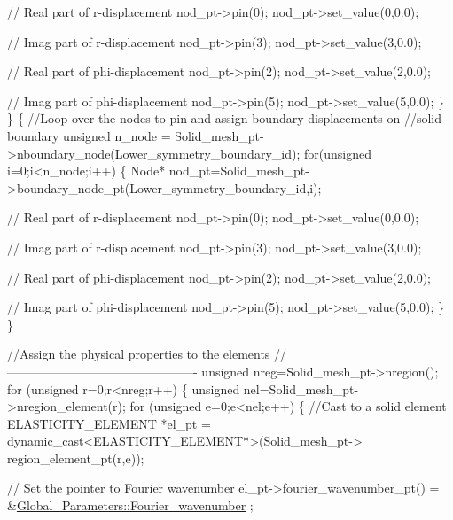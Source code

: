 \begin{DoxyCodeInclude}
{    \textcolor{comment}{// Real part of r-displacement }
    nod\_pt->pin(0);
    nod\_pt->set\_value(0,0.0);
    
    \textcolor{comment}{// Imag part of r-displacement}
    nod\_pt->pin(3);
    nod\_pt->set\_value(3,0.0);

    \textcolor{comment}{// Real part of phi-displacement }
    nod\_pt->pin(2);
    nod\_pt->set\_value(2,0.0);
    
    \textcolor{comment}{// Imag part of phi-displacement}
    nod\_pt->pin(5);
    nod\_pt->set\_value(5,0.0);
   \}
 \}
 \{
  \textcolor{comment}{//Loop over the nodes to pin and assign boundary displacements on }
  \textcolor{comment}{//solid boundary}
  \textcolor{keywordtype}{unsigned} n\_node = Solid\_mesh\_pt->nboundary\_node(Lower\_symmetry\_boundary\_id);
  \textcolor{keywordflow}{for}(\textcolor{keywordtype}{unsigned} i=0;i<n\_node;i++)
   \{
    Node* nod\_pt=Solid\_mesh\_pt->boundary\_node\_pt(Lower\_symmetry\_boundary\_id,i);

    \textcolor{comment}{// Real part of r-displacement }
    nod\_pt->pin(0);
    nod\_pt->set\_value(0,0.0);
    
    \textcolor{comment}{// Imag part of r-displacement}
    nod\_pt->pin(3);
    nod\_pt->set\_value(3,0.0);

    \textcolor{comment}{// Real part of phi-displacement }
    nod\_pt->pin(2);
    nod\_pt->set\_value(2,0.0);
    
    \textcolor{comment}{// Imag part of phi-displacement}
    nod\_pt->pin(5);
    nod\_pt->set\_value(5,0.0);
   \}
 \}


 \textcolor{comment}{//Assign the physical properties to the elements}
 \textcolor{comment}{//----------------------------------------------}
 \textcolor{keywordtype}{unsigned} nreg=Solid\_mesh\_pt->nregion();
 \textcolor{keywordflow}{for} (\textcolor{keywordtype}{unsigned} r=0;r<nreg;r++)
  \{
   \textcolor{keywordtype}{unsigned} nel=Solid\_mesh\_pt->nregion\_element(r);
   \textcolor{keywordflow}{for} (\textcolor{keywordtype}{unsigned} e=0;e<nel;e++)
    \{     
     \textcolor{comment}{//Cast to a solid element}
     ELASTICITY\_ELEMENT *el\_pt = 
      \textcolor{keyword}{dynamic\_cast<}ELASTICITY\_ELEMENT*\textcolor{keyword}{>}(Solid\_mesh\_pt->
                                        region\_element\_pt(r,e));
     
     \textcolor{comment}{// Set the pointer to Fourier wavenumber}
     el\_pt->fourier\_wavenumber\_pt() = &\hyperlink{namespaceGlobal__Parameters_ae1198385d90f52c4ed921520ae43a9e7}{Global\_Parameters::Fourier\_wavenumber}
      ;
   
}
\end{DoxyCodeInclude}
